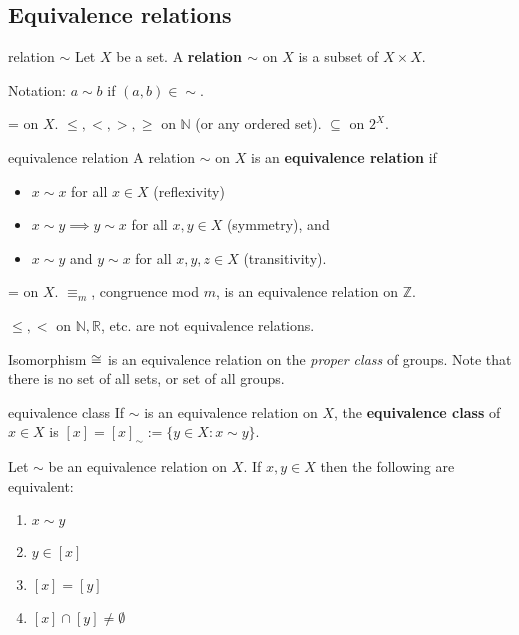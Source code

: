 \subsection{Equivalence relations}
\begin{defn}{relation $\sim$}
Let $X$ be a set. A \textbf{relation $\sim$} on $X$ is a subset of $X\times X$.

Notation: $a\sim b$ if $(a,b)\in \sim$.
\end{defn}

\begin{ex}
= on $X$. $\le,<,>,\ge $ on $\mathbb N$ (or any ordered set). $\subseteq$ on $2^X$.
\end{ex}

\begin{defn}{equivalence relation}
A relation $\sim$ on $X$ is an \textbf{equivalence relation} if
\begin{itemize}
	\item $x\sim x$ for all $x\in X$ (reflexivity)
	\item $x\sim y \implies y\sim x$ for all $x,y\in X$ (symmetry), and
	\item $x\sim y$ and $y\sim x$ for all $x,y,z\in X$ (transitivity). 
\end{itemize}
\end{defn}

\begin{ex}
= on $X$. $\equiv_m$, congruence mod $m$, is an equivalence relation on $\mathbb Z$.

$\le,<$ on $\mathbb N, \mathbb R$, etc. are not equivalence relations.

Isomorphism $\cong$ is an equivalence relation on the \textit{proper class} of groups. Note that there is no set of all sets, or set of all groups.
\end{ex}

\begin{defn}{equivalence class}
If $\sim$ is an equivalence relation on $X$, the \textbf{equivalence class} of $x\in X$ is $[x]=[x]_\sim := \{y\in X:x\sim y\}$.
\end{defn}

\begin{prop}
Let $\sim$ be an equivalence relation on $X$. If $x,y\in X$ then the following are equivalent:
\begin{enumerate}[label=(\alph*)]
\item $x\sim y$
\item $y\in[x]$
\item $[x]=[y]$
\item $[x]\cap[y]\ne\emptyset$
\end{enumerate}
\end{prop}

